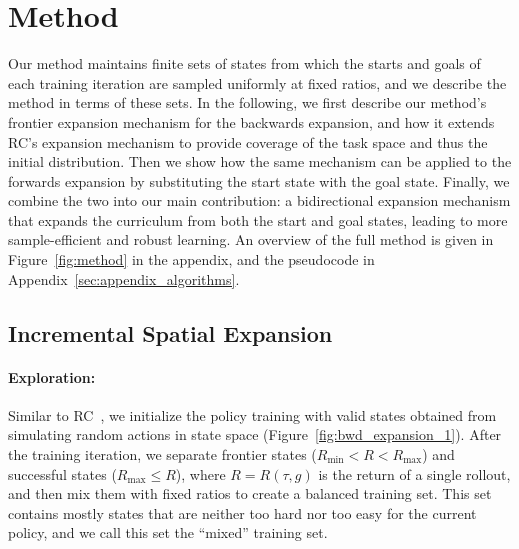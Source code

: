 \section{Method}\label{sec:method}
Our method maintains finite sets of states from which the starts and goals of each training iteration are sampled uniformly at fixed ratios, and we describe the method in terms of these sets.
In the following, we first describe our method's frontier expansion mechanism for the backwards expansion, and how it extends RC's expansion mechanism to provide coverage of the task space and thus the initial distribution. Then we show how the same mechanism can be applied to the forwards expansion by substituting the start state with the goal state. Finally, we combine the two into our main contribution: a bidirectional expansion mechanism that expands the curriculum from both the start and goal states, leading to more sample-efficient and robust learning. An overview of the full method is given in Figure~\ref{fig:method} in the appendix, and the pseudocode in Appendix~\ref{sec:appendix_algorithms}.



\subsection{Incremental Spatial Expansion}

\paragraph{Exploration:}
Similar to RC~\citep{florensa2017reverse}, we initialize the policy training with valid states obtained from simulating random actions in state space (Figure~\ref{fig:bwd_expansion_1}). After the training iteration, we separate frontier states ($R_{\min} < R < R_{\max}$) and successful states ($R_{\max} \leq R$), where $R = R(\tau, g)$ is the return of a single rollout, and then mix them with fixed ratios to create a balanced training set. %
This set contains mostly states that are neither too hard nor too easy for the current policy, and we call this set the ``mixed'' training set.

